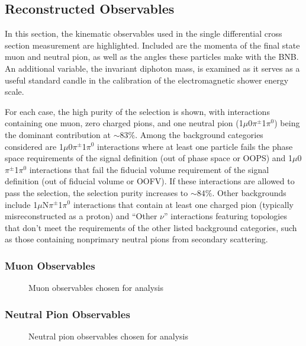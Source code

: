 \documentclass[../main.tex]{subfiles}
\begin{document}
\subsection{Reconstructed Observables}
\label{subsec:vars}
In this section, the kinematic observables used in the single differential cross section measurement are highlighted.  Included are the momenta of the final state muon and neutral pion, as well as the angles these particles make with the BNB.  An additional variable, the invariant diphoton mass, is examined as it serves as a useful standard candle in the calibration of the electromagnetic shower energy scale.

For each case, the high purity of the selection is shown, with interactions containing one muon, zero charged pions, and one neutral pion (1$\mu$0$\pi^{\pm}$1$\pi^{0}$) being the dominant contribution at $\sim 83\%$.  Among the background categories considered are 1$\mu$0$\pi^{\pm}$1$\pi^{0}$ interactions where at least one particle fails the phase space requirements of the signal definition (out of phase space or OOPS) and 1$\mu$0$\pi^{\pm}$1$\pi^{0}$ interactions that fail the fiducial volume requirement of the signal definition (out of fiducial volume or OOFV).  If these interactions are allowed to pass the selection, the selection purity increases to $\sim 84\%$.  Other backgrounds include 1$\mu$N$\pi^{\pm}$1$\pi^{0}$ interactions that contain at least one charged pion (typically misreconstructed as a proton) and ``Other $\nu$'' interactions featuring topologies that don't meet the requirements of the other listed background categories, such as those containing nonprimary neutral pions from secondary scattering.

\subsubsection{Muon Observables}
\begin{figure}[H]
    \center
    \caption{Muon observables chosen for analysis}
    \label{fig:reco_muon_observables}
\end{figure}

\subsubsection{Neutral Pion Observables}
\begin{figure}[H]
    \center
    \caption{Neutral pion observables chosen for analysis}
    \label{fig:reco_pi0_observables}
\end{figure}
\end{document}
